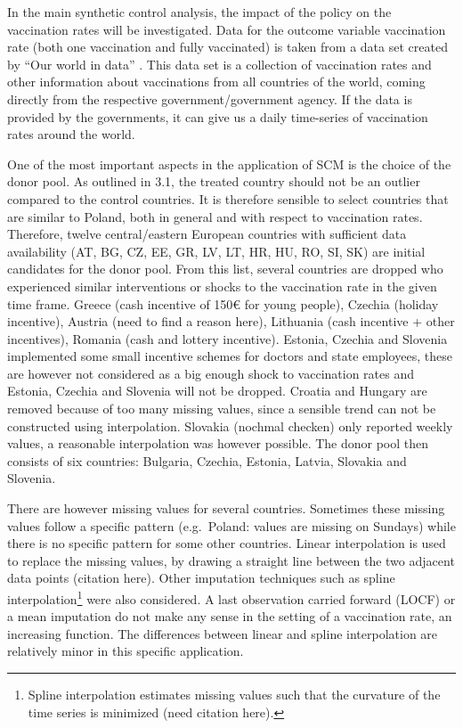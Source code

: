 \documentclass{scrbook}
\begin{document}
In the main synthetic control analysis, the impact of the policy on the
vaccination rates will be investigated. Data for the outcome variable
vaccination rate (both one vaccination and fully vaccinated) is taken
from a data set created by ``Our world in data''
\parencite{mathieu_global_2021}. This data set is a collection of
vaccination rates and other information about vaccinations from all
countries of the world, coming directly from the respective
government/government agency. If the data is provided by the
governments, it can give us a daily time-series of vaccination rates
around the world.

One of the most important aspects in the application of SCM is the
choice of the donor pool. As outlined in 3.1, the treated country should
not be an outlier compared to the control countries. It is therefore
sensible to select countries that are similar to Poland, both in general
and with respect to vaccination rates. Therefore, twelve central/eastern
European countries with sufficient data availability (AT, BG, CZ, EE,
GR, LV, LT, HR, HU, RO, SI, SK) are initial candidates for the donor
pool. From this list, several countries are dropped who experienced
similar interventions or shocks to the vaccination rate in the given
time frame. Greece (cash incentive of 150€ for young people), Czechia
(holiday incentive), Austria (need to find a reason here), Lithuania
(cash incentive + other incentives), Romania (cash and lottery
incentive). Estonia, Czechia and Slovenia implemented some small
incentive schemes for doctors and state employees, these are however not
considered as a big enough shock to vaccination rates and Estonia,
Czechia and Slovenia will not be dropped. Croatia and Hungary are
removed because of too many missing values, since a sensible trend can
not be constructed using interpolation. Slovakia (nochmal checken) only
reported weekly values, a reasonable interpolation was however possible.
The donor pool then consists of six countries: Bulgaria, Czechia,
Estonia, Latvia, Slovakia and Slovenia.

There are however missing values for several countries. Sometimes these
missing values follow a specific pattern (e.g.~Poland: values are
missing on Sundays) while there is no specific pattern for some other
countries. Linear interpolation is used to replace the missing values,
by drawing a straight line between the two adjacent data points
(citation here). Other imputation techniques such as spline
interpolation\footnote{Spline interpolation estimates missing values such that the curvature of the time series is minimized (need citation here).}
were also considered. A last observation carried forward (LOCF) or a
mean imputation do not make any sense in the setting of a vaccination
rate, an increasing function. The differences between linear and spline
interpolation are relatively minor in this specific application.
\end{document}
